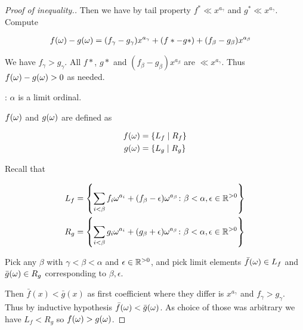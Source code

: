 \begin{proof}[Proof of inequality.]
	Then we have by tail property $f^* \ll x^{a_\gamma}$ and $g^* \ll x^{a_\gamma}$. Compute

	\begin{align*}
		f(\omega) - g(\omega) &= (f_\gamma - g_\gamma) x^{a_\gamma} + (f* - g*) + (f_\beta - g_\beta) x^{a_\beta}
	\end{align*}

	We have $f_\gamma > g_\gamma$.
	All $f*$, $g*$ and $(f_\beta - g_\beta) x^{a_\beta}$ are  $\ll x^{a_\gamma}$.
	Thus $f(\omega) - g(\omega) > 0$ as needed.

	: $\alpha$ is a limit ordinal.

	$f(\omega)$ and $g(\omega)$ are defined as 

	\begin{align*}
		f(\omega) &= \left\{ L_f \mid R_f \right\} \\
		g(\omega) &= \left\{ L_g \mid R_g \right\}
	\end{align*}

	Recall that

	\begin{align*}
		L_f &= \left\{ \sum_{i < \beta} f_i \omega^{a_i} + (f_\beta - \epsilon) \omega^{a_\beta}
		\colon \beta < \alpha, \epsilon \in \mathbb{R}^{>0} \right\} \\
		R_g &= \left\{ \sum_{i < \beta} g_i \omega^{a_i} + (g_\beta + \epsilon) \omega^{a_\beta}
		\colon \beta < \alpha, \epsilon \in \mathbb{R}^{>0} \right\}
	\end{align*}

	Pick any $\beta$ with $\gamma < \beta < \alpha$ and $\epsilon \in \mathbb{R}^{>0}$,
	and pick limit elements $\bar f(\omega) \in L_f$ and $\bar g(\omega) \in R_g$ corresponding to $\beta, \epsilon$.

	Then $\bar f(x) < \bar g(x)$ as first coefficient where they differ is $x^{a_\gamma}$ and $f_\gamma > g_\gamma$.
	Thus by inductive hypothesis $\bar f(\omega) < \bar g(\omega)$.
	As choice of those was arbitrary we have $L_f < R_g$ so $f(\omega) > g(\omega)$.
\end{proof}

